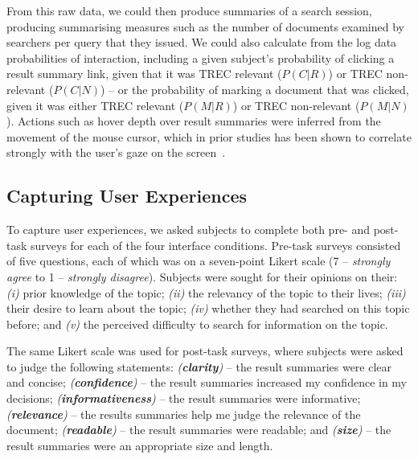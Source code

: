 \vspace{2mm}
\noindent
From this raw data, we could then produce summaries of a search session, producing summarising measures such as the number of documents examined by searchers per query that they issued. We could also calculate from the log data probabilities of interaction, including a given subject's probability of clicking a result summary link, given that it was TREC relevant ($P(C|R)$) or TREC non-relevant ($P(C|N)$) -- or the probability of marking a document that was clicked, given it was either TREC relevant ($P(M|R)$) or TREC non-relevant ($P(M|N)$). Actions such as hover depth over result summaries were inferred from the movement of the mouse cursor, which in prior studies has been shown to correlate strongly with the user's gaze on the screen~\cite{chen2001mouse_cursor, smucker2014judging_relevance_movements}.

\subsection{Capturing User Experiences}\label{sec:method:experiences}
To capture user experiences, we asked subjects to complete both pre- and post-task surveys for each of the four interface conditions. Pre-task surveys consisted of five questions, each of which was on a seven-point Likert scale (7 -- \emph{strongly agree} to 1 -- \emph{strongly disagree}). Subjects were sought for their opinions on their: \emph{(i)} prior knowledge of the topic; \emph{(ii)} the relevancy of the topic to their lives; \emph{(iii)} their desire to learn about the topic; \emph{(iv)} whether they had searched on this topic before; and \emph{(v)} the perceived difficulty to search for information on the topic.

The same Likert scale was used for post-task surveys, where subjects were asked to judge the following statements: \emph{(\textbf{clarity})} -- the result summaries were clear and concise; \emph{(\textbf{confidence})} -- the result summaries increased my confidence in my decisions; \emph{(\textbf{informativeness})} -- the result summaries were informative; \emph{(\textbf{relevance})} -- the results summaries help me judge the relevance of the document; \emph{(\textbf{readable})} -- the result summaries were readable; and \emph{(\textbf{size})} -- the result summaries were an appropriate size and length.


